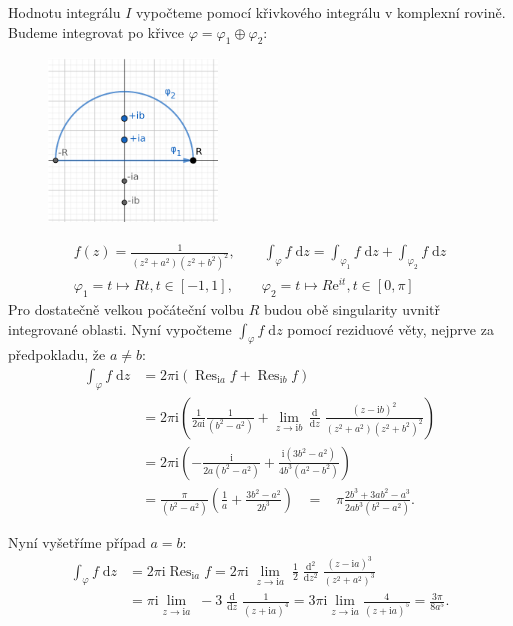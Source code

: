 \documentclass[10pt,a4paper]{article}
\newcommand{\const}[1]{\text{#1}}
\newcommand{\Res}{\operatorname{Res}}
\renewcommand{\d}[1]{\;\const{d}#1}
\newcommand{\dd}[2]{\frac{\const{d} #1}{\const{d} #2} \;}
\newcommand{\e}[1]{\const{e}^{#1}}
\renewcommand{\i}{\const{i}}
\begin{document}
Hodnotu integrálu $I$ vypočteme pomocí křivkového integrálu v komplexní rovině. Budeme integrovat po křivce $\varphi = \varphi_1 \oplus \varphi_2$:
\begin{figure}[H]
    \centering
    \includegraphics[width=0.4\textwidth]{du2u1param.pdf}
    \label{obr:du2u1param}
\end{figure}
\begin{gather*}
    f(z) = \frac{1}{(z^2+a^2)(z^2+b^2)^2},
    \hspace{2em}
    \int_\varphi f \d{z} = \int_{\varphi_1} f \d{z} + \int_{\varphi_2} f \d{z}
    \\[5pt]
    \varphi_1 = t \mapsto Rt, t \in [-1, 1],
    \hspace{2em}
    \varphi_2 = t \mapsto R\e{it}, t \in [0, \pi]
\end{gather*}
Pro dostatečně velkou počáteční volbu $R$ budou obě singularity uvnitř integrované oblasti. Nyní vypočteme $\int_\varphi f \d{z}$ pomocí reziduové věty, nejprve za předpokladu, že $a\neq b$:
\begin{align*}
    \int_\varphi f \d{z}
    &= 2\pi\i \left( \Res_{\i a} f + \Res_{\i b} f \right) \\
    &= 2\pi\i \left(
        \frac{1}{2a\i} \frac{1}{(b^2 - a^2)} +
        \lim_{z \to \i b} \,\dd{}{z}\! \frac{(z- \i b)^2}{(z^2+a^2)(z^2+b^2)^2}
    \right) \\[5pt]
    &= 2\pi\i \left(
        -\frac{\i}{2a(b^2 - a^2)} +
        \frac{\i (3b^2 - a^2)}{4b^3 (a^2 - b^2)}
    \right)
    \\[5pt]
    &= \frac{\pi}{(b^2 - a^2)} \left( \frac{1}{a} + \frac{3b^2 - a^2}{2b^3} \right)
    \;\;\; = \;\;\; \pi \frac{2b^3 + 3ab^2 - a^3}{2ab^3 (b^2 - a^2)}.
\end{align*}

Nyní vyšetříme případ $a=b$:
\begin{align*}
    \int_\varphi f \d{z}
    &= 2\pi\i \Res_{\i a} f
    = 2\pi\i \; \lim_{z \to \i a} \; \frac{1}{2} \; \dd{^2}{z^2} \frac{(z-\i a)^3}{(z^2 + a^2)^3}
    \\[5pt]
    &= \pi \i \lim_{z \to \i a} \; -3 \; \dd{}{z} \frac{1}{(z + \i a)^4}
    = 3\pi\i \lim_{z \to \i a} \frac{4}{(z+\i a)^5}
    = \frac{3\pi}{8a^5}.
\end{align*}
\end{document}
